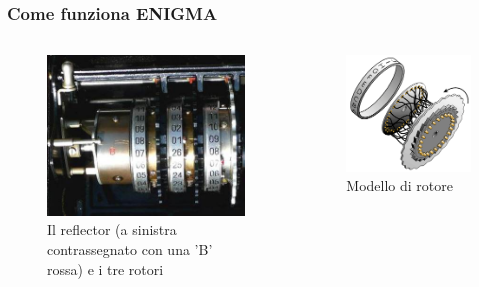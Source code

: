 	\begin{frame}
		\frametitle{Come funziona ENIGMA}
		\begin{columns}
			\begin{column}{0.5\textwidth}
				\begin{center}
					\begin{figure}
						\includegraphics[width=\columnwidth]{img/rotors}
						\caption{Il reflector (a sinistra contrassegnato con una 'B' rossa) e i tre rotori}
					\end{figure}
				\end{center}
			\end{column}
			\begin{column}{0.5\textwidth}
				\begin{center}
					\begin{figure}
						\includegraphics[width=\columnwidth]{img/rotorsexp}
						\caption{Modello di rotore}
					\end{figure}
				\end{center}
			\end{column}
		\end{columns}
	\end{frame}
